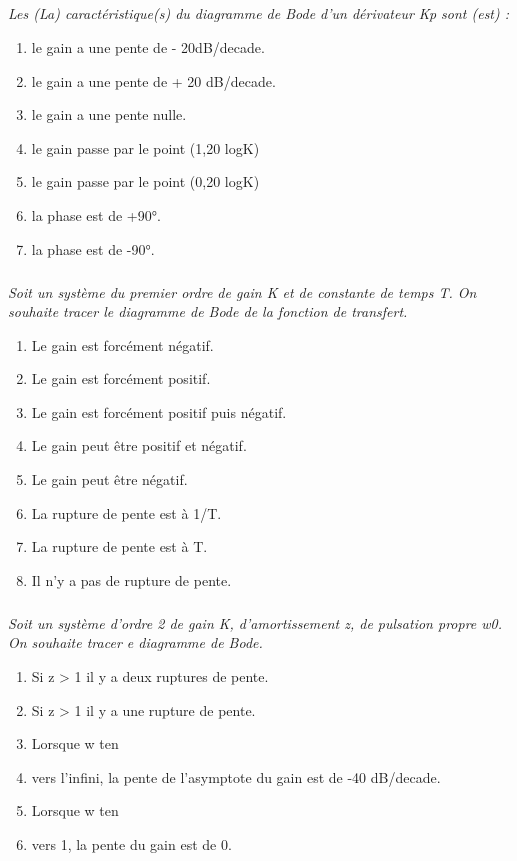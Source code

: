 \documentclass[10pt,fleqn]{article} %
\begin{document}
\begin{multicols}{2}
\subparagraph{}\textit{Les (La) caractéristique(s) du diagramme de Bode d'un dérivateur Kp sont (est)
:}
\begin{enumerate}
\item le gain a une pente de - 20dB/decade.
\item le gain a une pente de + 20 dB/decade.
\item le gain a une pente nulle.
\item le gain passe par le point (1,20 logK)
\item le gain passe par le point (0,20 logK)
\item la phase est de +90°.
\item la phase est de -90°.
\end{enumerate}

\subparagraph{}\textit{Soit un système du premier ordre de gain K et de constante de temps T. On
souhaite tracer le diagramme de Bode de la fonction de transfert.}
\begin{enumerate}
\item Le gain est forcément négatif.
\item Le gain est forcément positif.
\item Le gain est forcément positif puis négatif.
\item Le gain peut être positif et négatif.
\item Le gain peut être négatif.
\item La rupture de pente est à 1/T.
\item La rupture de pente est à T.
\item Il n'y a pas de rupture de pente.
\end{enumerate}

\subparagraph{}\textit{Soit un système d'ordre 2 de gain K, d'amortissement z, de pulsation propre
w0. On souhaite tracer e diagramme de Bode.}
\begin{enumerate}
\item Si z > 1 il y a deux ruptures de pente.
\item Si z > 1 il y a une rupture de pente.
\item Lorsque w ten\item vers l'infini, la pente de l'asymptote du gain est de -40 dB/decade.
\item Lorsque w ten\item vers 1, la pente du gain est de 0.
\end{enumerate}


\end{multicols}
\end{document}
